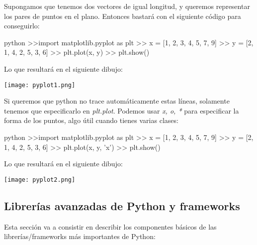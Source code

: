 \documentclass{article}
\begin{document}
Supongamos que tenemos dos vectores de igual longitud, y queremos representar los pares de puntos en el plano. Entonces bastará con el siguiente código para conseguirlo:
\begin{mintedbox}{python}
>>import matplotlib.pyplot as plt
>> x = [1, 2, 3, 4, 5, 7, 9]
>> y = [2, 1, 4, 2, 5, 3, 6]
>> plt.plot(x, y)
>> plt.show()
\end{mintedbox}
Lo que resultará en el siguiente dibujo:
\begin{center}
\texttt{[image: pyplot1.png]}
\end{center}
Si queremos que python no trace automáticamente estas líneas, solamente tenemos que especificarlo en \textit{plt.plot}. Podemos usar \textit{x, o, *} para especificar la forma de los puntos, algo útil cuando tienes varias clases:
\begin{mintedbox}{python}
>>import matplotlib.pyplot as plt
>> x = [1, 2, 3, 4, 5, 7, 9]
>> y = [2, 1, 4, 2, 5, 3, 6]
>> plt.plot(x, y, 'x')
>> plt.show()
\end{mintedbox}
Lo que resultará en el siguiente dibujo:
\begin{center}
\texttt{[image: pyplot2.png]}
\end{center}
\subsection{Librerías avanzadas de Python y frameworks}
Esta sección va a consistir en describir los componentes básicos de las librerías/frameworks más importantes de Python:
\end{document}
